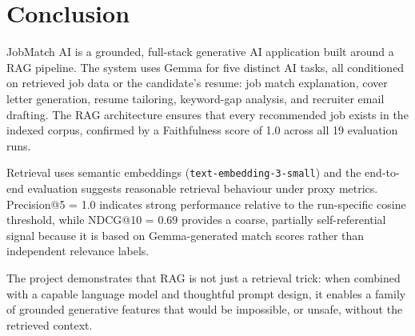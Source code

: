 \documentclass[11pt]{article}
\begin{document}
\section{Conclusion}

JobMatch AI is a grounded, full-stack generative AI application built around a RAG pipeline. The system uses Gemma for five distinct AI tasks, all conditioned on retrieved job data or the candidate's resume: job match explanation, cover letter generation, resume tailoring, keyword-gap analysis, and recruiter email drafting. The RAG architecture ensures that every recommended job exists in the indexed corpus, confirmed by a Faithfulness score of 1.0 across all 19 evaluation runs.

Retrieval uses semantic embeddings (\texttt{text-embedding-3-small}) and the end-to-end evaluation suggests reasonable retrieval behaviour under proxy metrics. Precision@5 = 1.0 indicates strong performance relative to the run-specific cosine threshold, while NDCG@10 = 0.69 provides a coarse, partially self-referential signal because it is based on Gemma-generated match scores rather than independent relevance labels.

The project demonstrates that RAG is not just a retrieval trick: when combined with a capable language model and thoughtful prompt design, it enables a family of grounded generative features that would be impossible, or unsafe, without the retrieved context.
\end{document}
